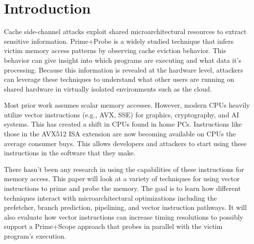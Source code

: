 \documentclass[article]{IEEEtran}
\begin{document}
\begin{abstract}
Cache side-channel attacks such as Prime+Probe remain a significant threat in modern microarchitectures. While prior work primarily focuses on scalar memory accesses, the role of vector (SIMD) instructions in these attacks is not well understood. This paper evaluates how vector instructions (e.g., AVX) influence cache behavior, timing resolution, and the effectiveness of Prime+Probe attacks. To that aim, multiple PoC programs were created each with different levels of the attack in mind to explore vector instructions, how they interact with memory, and what different cache levels look like. During evaluation, it was found the the vpgather set of instructions can be used to detect memory access from different sets in the L1D cache. During evaluation, there were multiple findings that also lead to difficulties with this reading. First, apparent pipelining leading to subsequent Prime+Probe iterations on the same or different sets resulting in different timings. Second, micro-op optimization around vector instructions causing worse performance when isolated with lfence. Lastly, noise around scheduling and cache flushing causing major outliers (>1000\% baseline of 100+/-10).
\end{abstract}

\section{Introduction}
Cache side-channel attacks exploit shared microarchitectural resources to extract sensitive information. Prime+Probe is a widely studied technique that infers victim memory access patterns by observing cache eviction behavior. This behavior can give insight into which programs are executing and what data it's processing. Because this information is revealed at the hardware level, attackers can leverage these techniques to understand what other users are running on shared hardware in virtually isolated environments such as the cloud.

Most prior work assumes scalar memory accesses. However, modern CPUs heavily utilize vector instructions (e.g., AVX, SSE) for graphics, cryptography, and AI systems. This has created a shift in CPUs found in home PCs. Instructions like those in the AVX512 ISA extension are now becoming available on CPUs the average consumer buys. This allows developers and attackers to start using these instructions in the software that they make.

There hasn't been any research in using the capabilities of these instructions for memory access. This paper will look at a variety of techniques for using vector instructions to prime and probe the memory. The goal is to learn how different techniques interact with microarchitectural optimizations including the prefetcher, branch prediction, pipelining, and vector instruction pathways. It will also evaluate how vector instructions can increase timing resolutions to possibly support a Prime+Scope approach\cite{10.1145/3460120.3484816} that probes in parallel with the victim program's execution.
\end{document}
